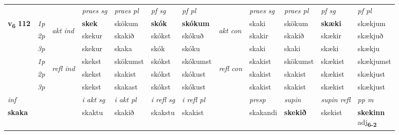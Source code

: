 \begin{longtable}[l]{X>{\footnotesize\itshape}llXXXXlXXXX}
 & &   & \textit{praes sg}  & \textit{praes pl}    & \textit{ pf sg} & \textit{pf pl} & & \textit{praes sg}  & \textit{praes pl}    & \textit{pf sg} & \textit{pf pl }  \\ \cmidrule{4-7} \cmidrule{9-12}
 \multirow{2}{*}{{{\textbf{v{\textsubscript{6}}} \Large{\textbf{112}}}}}  & 1p & \multirow{3}{*}{\begin{turn}{90}\textit{akt ind}\end{turn}} & \textbf{skek} & skökum & \textbf{skók} & \textbf{skókum} & \multirow{3}{*}{\begin{turn}{90}\textit{akt con}\end{turn}} &skaki & skökum & \textbf{skæki} & skækjum\\*
 & 2p &  &  skekur  & skakið & skókst & skókuð & & skakir & skakið & skækir & skækjuð \\*
 & 3p &  & skekur & skaka & skók & skóku & & skaki & skaki& skæki & skækju \\*
\cmidrule{4-7} \cmidrule{9-12}
 & 1p & \multirow{3}{*}{\begin{turn}{90}\textit{refl ind}\end{turn}}  & skekst & skökumst & skókst & skókumst & \multirow{3}{*}{\begin{turn}{90}\textit{refl con}\end{turn}}  &skakist & skökumst & skækist & skækjumst \\*
 & 2p &  & skekst & skakist & skókst & skókust & &skakist & skakist & skækist & skækjust \\*
 & 3p  & & skekst & skakast & skókst & skókust & & skakist & skakist& skækist & skækjust \\*
\cmidrule{4-7} \cmidrule{9-12}

   {\textit{inf}} & &  & \textit{i akt sg} & \textit{i akt pl} & \textit{i refl sg} & \textit{i refl pl} && \textit{presp} & \textit{supin} & \textit{supin refl} & \textit{pp m} \\*
  {\textbf{skaka}} & && skaktu  & skakið & skakstu & skakist && skakandi &  \textbf{skekið} & skekist & \specialcell{\textbf{skekinn} \\ adj\textbf{\textsubscript{6-2}}} \\*

\midrule


\end{longtable}
